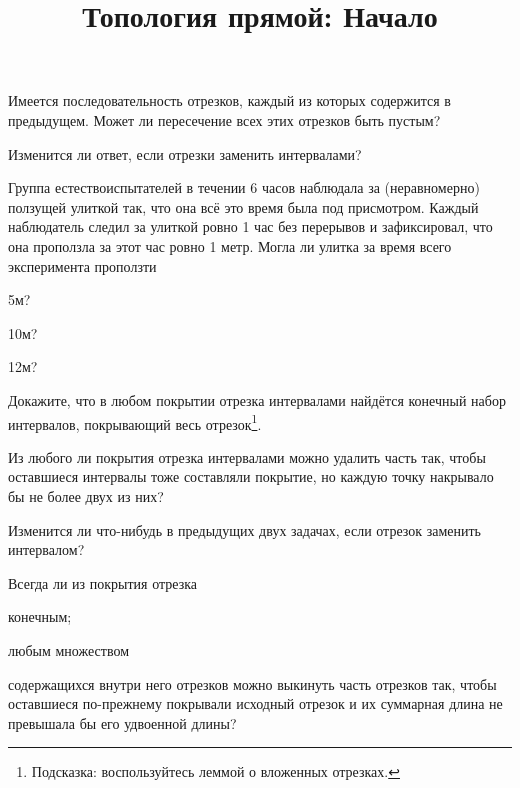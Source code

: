 \documentclass[a4paper, 12pt, num=28]{listok}
\begin{document}
\title{Топология прямой: Начало}
\maketitle{}
\begin{problem}\label{subsec}
	Имеется последовательность отрезков, каждый из которых содержится в предыдущем.
	Может ли пересечение всех этих отрезков быть пустым?
\end{problem}
\begin{problem}
	Изменится ли ответ, если отрезки заменить интервалами?
\end{problem}
\begin{problem}
	Группа естествоиспытателей в течении 6 часов наблюдала за (неравномерно) ползущей улиткой так,
	что она всё это время была под присмотром.
	Каждый наблюдатель следил за улиткой ровно 1 час без перерывов и зафиксировал, что она проползла за этот
	час ровно 1 метр. Могла ли улитка за время всего эксперимента проползти
	\begin{probparts}
		\item 5м?
		\item 10м?
		\item 12м?
	\end{probparts}
\end{problem}
\begin{problem}\label{coversec}
	Докажите, что в любом покрытии отрезка интервалами найдётся конечный набор интервалов, покрывающий весь отрезок\footnote{%
		Подсказка: воспользуйтесь леммой о вложенных отрезках.
	}.
\end{problem}
\begin{problem}
	Из любого ли покрытия отрезка интервалами можно удалить часть так, чтобы оставшиеся интервалы тоже составляли покрытие,
	но каждую точку накрывало бы не более двух из них?
\end{problem}
\begin{problem}
	Изменится ли что-нибудь в предыдущих двух задачах, если отрезок заменить интервалом?
\end{problem}
\begin{problem}
	Всегда ли из покрытия отрезка
	\begin{probparts}
		\item конечным;
		\item любым множеством
	\end{probparts}
	содержащихся внутри него отрезков можно выкинуть часть отрезков так,
	чтобы оставшиеся по-прежнему покрывали исходный отрезок и их суммарная длина не превышала бы его удвоенной длины?
\end{problem}
\end{document}
